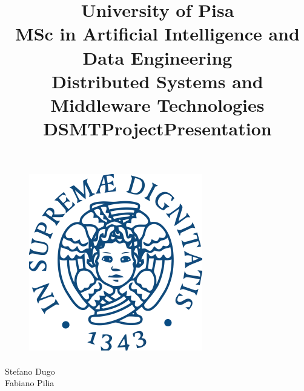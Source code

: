 \documentclass{article}
\title{
    \large
    University of Pisa \\
    MSc in Artificial Intelligence and Data Engineering\\
    Distributed Systems and Middleware Technologies\\
    \vspace{20mm}
    \huge
    \textbf{DSMTProjectPresentation}
    }
\author{}
\date{}
\begin{document}
\begin{titlepage}
    \begin{figure}
        \centering
        \includegraphics[scale=0.5]{images/cherubino.png}
    \vspace{-5mm}
    \end{figure}
    \maketitle
    \paragraph{}
    \begin{flushright}
    \vspace{15mm}
    \large
    Stefano Dugo\\
    Fabiano Pilia
    \end{flushright}
    \thispagestyle{empty}
    
    
    \vspace{16mm}
    
    
\end{titlepage}


\maketitle

\tableofcontents


\end{document}
